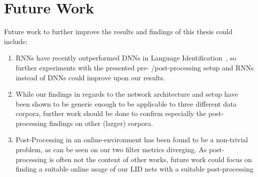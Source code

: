 \section{Future Work}
\label{sec:fw}

Future work to further improve the results and findings of this thesis could include:

\begin{enumerate}
\item RNNs have recently outperformed DNNs in Language Identification~\cite{gonzalez2014automatic}, so further experiments with the presented pre- /post-processing setup and RNNs instead of DNNs could improve upon our results.
\item While our findings in regards to the network architecture and setup have been shown to be generic enough to be applicable to three different data corpora, further work should be done to confirm especially the post-processing findings on other (larger) corpora.
\item Post-Processing in an online-environment has been found to be a non-trivial problem, as can be seen on our two filter metrics diverging. As post-processing is often not the content of other works, future work could focus on finding a suitable online usage of our LID nets with a suitable post-processing
\end{enumerate}